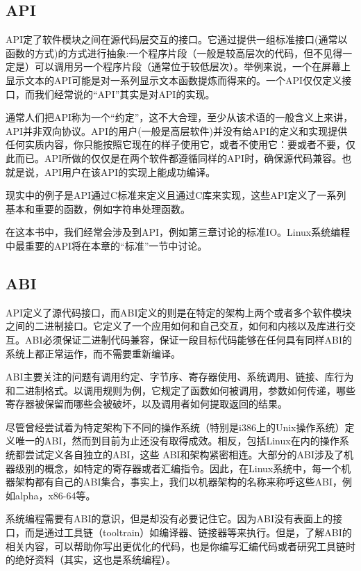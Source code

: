 \subsection{API}
API定了软件模块之间在源代码层交互的接口。它通过提供一组标准接口(通常以函数的方式)的方式进行抽象:一个程序片段（一般是较高层次的代码，但不见得一定是）可以调用另一个程序片段（通常位于较低层次）。举例来说，一个在屏幕上显示文本的API可能是对一系列显示文本函数提炼而得来的。一个API仅仅定义接口，而我们经常说的“API”其实是对API的实现。

通常人们把API称为一个“约定”，这不大合理，至少从该术语的一般含义上来讲，API并非双向协议。API的用户(一般是高层软件)并没有给API的定义和实现提供任何实质内容，你只能按照它现在的样子使用它，或者不使用它：要或者不要，仅此而已。API所做的仅仅是在两个软件都遵循同样的API时，确保源代码兼容。也就是说，API用户在该API的实现上能成功编译。

现实中的例子是API通过C标准来定义且通过C库来实现，这些API定义了一系列基本和重要的函数，例如字符串处理函数。

在这本书中，我们经常会涉及到API，例如第三章讨论的标准I\/O。Linux系统编程中最重要的API将在本章的“标准”一节中讨论。 



\subsection{ABI}
API定义了源代码接口，而ABI定义的则是在特定的架构上两个或者多个软件模块之间的二进制接口。它定义了一个应用如何和自己交互，如何和内核以及库进行交互。ABI必须保证二进制代码兼容，保证一段目标代码能够在任何具有同样ABI的系统上都正常运作，而不需要重新编译。

ABI主要关注的问题有调用约定、字节序、寄存器使用、系统调用、链接、库行为和二进制格式。以调用规则为例，它规定了函数如何被调用，参数如何传递，哪些寄存器被保留而哪些会被破坏，以及调用者如何提取返回的结果。

尽管曾经尝试着为特定架构下不同的操作系统（特别是i386上的Unix操作系统）定义唯一的ABI，然而到目前为止还没有取得成效。相反，包括Linux在内的操作系统都尝试定义各自独立的ABI，这些 ABI和架构紧密相连。大部分的ABI涉及了机器级别的概念，如特定的寄存器或者汇编指令。因此，在Linux系统中，每一个机器架构都有自己的ABI集合，事实上，我们以机器架构的名称来称呼这些ABI，例如alpha，x86-64等。

系统编程需要有ABI的意识，但是却没有必要记住它。因为ABI没有表面上的接口，而是通过工具链（tooltrain）如编译器、链接器等来执行。但是，了解ABI的相关内容，可以帮助你写出更优化的代码，也是你编写汇编代码或者研究工具链时的绝好资料（其实，这也是系统编程）。

